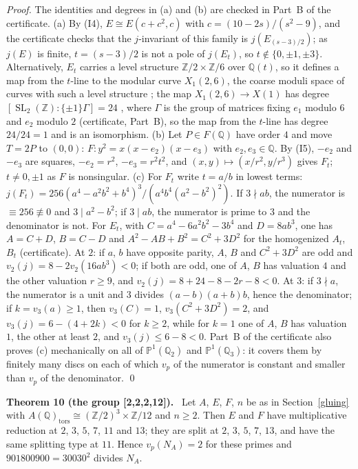 \documentclass[11pt]{article}
\newenvironment{statement}[1]{\par\medskip\noindent\phantomsection\textbf{#1}\ }{\par\medskip}
\newcommand{\Q}{\mathbb Q}
\newcommand{\Z}{\mathbb Z}
\newcommand{\tors}{\mathrm{tors}}
\DeclareMathOperator{\SL}{SL}
\begin{document}
\emph{Proof.} The identities and degrees in (a) and (b) are checked in Part~B of the certificate. (a) By (I4),
\(E\cong E(c+c^2,c)\) with \(c=(10-2s)/(s^2-9)\), and the certificate checks that the \(j\)-invariant of this family is
\(j(E_{(s-3)/2})\); as \(j(E)\) is finite, \(t=(s-3)/2\) is not a pole of \(j(E_t)\), so
\(t\notin\{0,\pm1,\pm3\}\).
Alternatively, \(E_t\) carries a level structure \(\Z/2\times\Z/6\) over \(\Q(t)\), so it defines
a map from the \(t\)-line to the modular curve \(X_1(2,6)\), the coarse moduli space of curves with such a level
structure \cite[p.~125]{KM}; the map \(X_1(2,6)\to X(1)\) has degree \([\SL_2(\Z):\{\pm1\}\Gamma]=24\)
\cite[Exercise~3.1.1]{DS}, where \(\Gamma\) is the group of matrices fixing \(e_1\) modulo \(6\) and \(e_2\) modulo
\(2\) (certificate, Part~B), so the map from the \(t\)-line has degree \(24/24=1\) and is an isomorphism. (b) Let
\(P\in F(\Q)\) have order \(4\) and move \(T=2P\) to \((0,0)\): \(F\colon y^2=x(x-e_2)(x-e_3)\) with \(e_2,e_3\in\Q\).
By (I5), \(-e_2\) and \(-e_3\) are squares, \(-e_2=r^2\), \(-e_3=r^2t^2\), and \((x,y)\mapsto(x/r^2,y/r^3)\) gives
\(F_t\); \(t\neq0,\pm1\) as \(F\) is nonsingular. (c) For \(F_t\) write \(t=a/b\) in lowest terms:
\(j(F_t)=256(a^4-a^2b^2+b^4)^3/(a^4b^4(a^2-b^2)^2)\). If \(3\nmid ab\), the numerator is \(\equiv256\not\equiv0\)
and \(3\mid a^2-b^2\); if \(3\mid ab\), the numerator is prime to \(3\) and the denominator is not. For \(E_t\), with
\(C=a^4-6a^2b^2-3b^4\) and \(D=8ab^3\), one has \(A=C+D\), \(B=C-D\) and \(A^2-AB+B^2=C^2+3D^2\) for the homogenized
\(A_t\), \(B_t\) (certificate). At \(2\): if \(a\), \(b\) have opposite parity, \(A\), \(B\) and \(C^2+3D^2\) are odd
and \(v_2(j)=8-2v_2(16ab^3)<0\); if both are odd, one of \(A\), \(B\) has valuation \(4\) and the other valuation
\(r\ge9\), and \(v_2(j)=8+24-8-2r-8<0\). At \(3\): if \(3\nmid a\), the numerator is a unit and \(3\) divides
\((a-b)(a+b)b\), hence the denominator; if \(k=v_3(a)\ge1\), then \(v_3(C)=1\), \(v_3(C^2+3D^2)=2\), and
\(v_3(j)=6-(4+2k)<0\) for \(k\ge2\), while for \(k=1\) one of \(A\), \(B\) has valuation \(1\), the other at least
\(2\), and \(v_3(j)\le6-8<0\). Part~B of the certificate also proves (c) mechanically on all of \(\mathbb
P^1(\Q_2)\) and \(\mathbb P^1(\Q_3)\): it covers them by finitely many discs on each of which \(v_p\) of the
numerator is constant and smaller than \(v_p\) of the denominator. \qed

\begin{statement}{Theorem 10 (the group [2,2,2,12]).}\label{thm-22212}
Let \(A\), \(E\), \(F\), \(n\) be as in Section~\ref{gluing} with \(A(\Q)_\tors\cong(\Z/2)^3\times\Z/12\) and
\(n\ge2\). Then \(E\) and \(F\) have multiplicative reduction at \(2\), \(3\), \(5\), \(7\), \(11\) and \(13\); they
are split at \(2\), \(3\), \(5\), \(7\), \(13\), and have the same splitting type at \(11\). Hence \(v_p(N_A)=2\) for
these primes and \(901800900=30030^2\) divides \(N_A\).
\end{statement}
\end{document}
